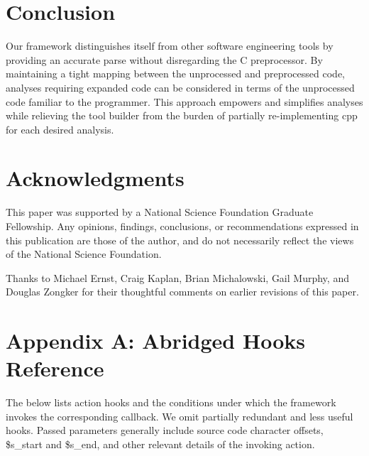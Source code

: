 \documentclass{article}
\newcommand{\pcp}{\mbox{\textsf{PCp}$^3$}}
\newcommand{\Cpp}{\mbox{\textsf{cpp}}}
\newcommand{\Perl}{\mbox{Perl}}
\newcommand{\C}{\mbox{C}}
\begin{document}


\section*{Conclusion}
\label{sec:conclusion}

Our framework distinguishes itself from other software
engineering tools by providing an accurate parse without disregarding
the \C{} preprocessor.  By maintaining a tight
mapping between the unprocessed and preprocessed code, analyses
requiring expanded code can be considered in terms of the unprocessed
code familiar to the programmer.  This approach empowers and simplifies
analyses while relieving the tool builder from the burden of partially 
re-implementing \Cpp{} for each desired analysis.

\section*{Acknowledgments}
\label{sec:ack}
This paper was supported by a National Science Foundation Graduate
Fellowship. Any opinions, findings, conclusions, or recommendations
expressed in this publication are those of the author, and do not
necessarily reflect the views of the National Science Foundation.

Thanks to Michael Ernst, Craig Kaplan, Brian Michalowski, Gail Murphy, and Douglas
Zongker for their thoughtful comments on earlier revisions of this
paper.

\appendix

\section*{Appendix A: Abridged Hooks Reference}
\label{sec:hooks}

The below lists action hooks and the conditions under which the
framework invokes the corresponding callback.  We omit partially
redundant and less useful hooks. Passed parameters
generally include source code character offsets, \$s\_\-start and
\$s\_\-end, and other relevant details of the invoking action.
\end{document}
